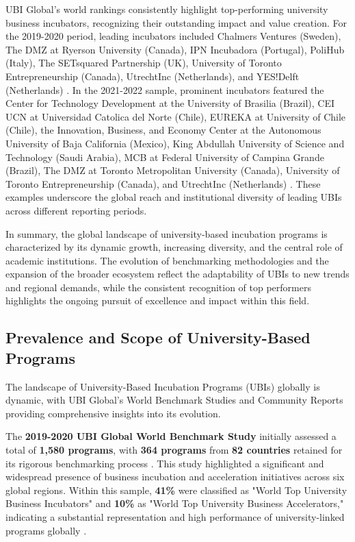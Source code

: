 \documentclass[../Main.tex]{subfiles}%
\begin{document}
	UBI Global's world rankings consistently highlight top-performing university business incubators, recognizing their outstanding impact and value creation. For the 2019-2020 period, leading incubators included Chalmers Ventures (Sweden), The DMZ at Ryerson University (Canada), IPN Incubadora (Portugal), PoliHub (Italy), The SETsquared Partnership (UK), University of Toronto Entrepreneurship (Canada), UtrechtInc (Netherlands), and YES!Delft (Netherlands) \cite{ubi2019world}. In the 2021-2022 sample, prominent incubators featured the Center for Technology Development at the University of Brasilia (Brazil), CEI UCN at Universidad Catolica del Norte (Chile), EUREKA at University of Chile (Chile), the Innovation, Business, and Economy Center at the Autonomous University of Baja California (Mexico), King Abdullah University of Science and Technology (Saudi Arabia), MCB at Federal University of Campina Grande (Brazil), The DMZ at Toronto Metropolitan University (Canada), University of Toronto Entrepreneurship (Canada), and UtrechtInc (Netherlands) \cite{ubi2021world}. These examples underscore the global reach and institutional diversity of leading UBIs across different reporting periods.
	
	In summary, the global landscape of university-based incubation programs is characterized by its dynamic growth, increasing diversity, and the central role of academic institutions. The evolution of benchmarking methodologies and the expansion of the broader ecosystem reflect the adaptability of UBIs to new trends and regional demands, while the consistent recognition of top performers highlights the ongoing pursuit of excellence and impact within this field.
	
	\subsection{Prevalence and Scope of University-Based Programs}
	The landscape of University-Based Incubation Programs (UBIs) globally is dynamic, with UBI Global's World Benchmark Studies and Community Reports providing comprehensive insights into its evolution.
	
	The \textbf{2019-2020 UBI Global World Benchmark Study} initially assessed a total of \textbf{1,580 programs}, with \textbf{364 programs} from \textbf{82 countries} retained for its rigorous benchmarking process \cite{ubi2019world}. This study highlighted a significant and widespread presence of business incubation and acceleration initiatives across six global regions. Within this sample, \textbf{41\%} were classified as "World Top University Business Incubators" and \textbf{10\%} as "World Top University Business Accelerators," indicating a substantial representation and high performance of university-linked programs globally \cite{ubi2019world}.
	
\end{document}

